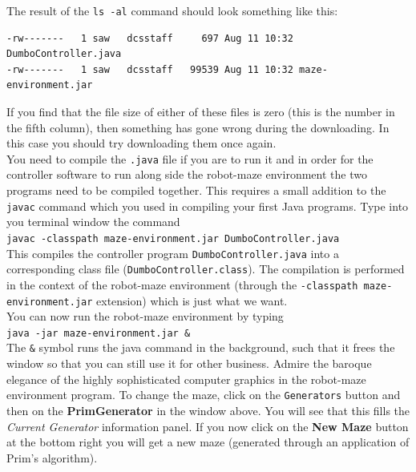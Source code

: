 \noindent
The result of the {\tt ls -al} command should look something like this:

\begin{verbatim}
-rw-------   1 saw   dcsstaff     697 Aug 11 10:32 DumboController.java
-rw-------   1 saw   dcsstaff   99539 Aug 11 10:32 maze-environment.jar
\end{verbatim}

\noindent
If you find that the file size of either of these files is zero
(this is the number in the fifth column), then something has gone wrong during the 
downloading. In this case you should try downloading them once again. \\

\noindent
You need to compile the {\tt .java} file if you are to run it and in order for
the controller software to run along side the robot-maze environment
the two programs need to be compiled together. This requires a small 
addition to the {\tt javac} command which you used in compiling your 
first Java programs. Type into you terminal window the command \\

{\tt javac -classpath maze-environment.jar DumboController.java} \\

\noindent
This compiles the controller program {\tt DumboController.java}
into a corresponding class file ({\tt DumboController.class}). The 
compilation is performed in the context of the 
robot-maze environment (through the {\tt -classpath maze-environment.jar} 
extension) which is just what we want.\\

\noindent
You can now run the robot-maze environment by typing \\

{\tt java -jar maze-environment.jar \&} \\

\noindent
The {\tt \&} symbol runs the java command in the background,
such that it frees the window so that you can still use it for 
other business. Admire the baroque elegance of the highly sophisticated
computer graphics in the robot-maze environment program. To change
the maze, click on the {\tt Generators} button and then on 
the {\bf PrimGenerator} in the window above. You will see that this fills
the {\em Current Generator} information panel. If you now click on the 
{\bf New Maze} button at the bottom right you will 
get a new maze (generated through an application of Prim's algorithm). \\

